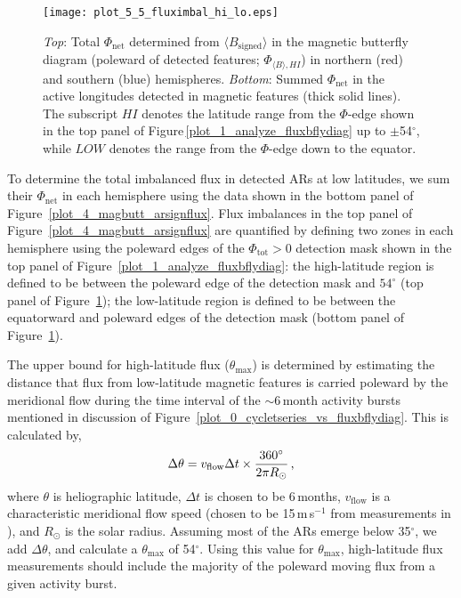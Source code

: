 \begin{figure}[!t]
\centerline{\texttt{[image: plot\_5\_5\_fluximbal\_hi\_lo.eps]}}
\caption[The $\Phi_{\mathrm{net}}$ measured in each hemisphere.]{\emph{Top}: Total $\Phi_{\mathrm{net}}$ determined from $\langle B_{\mathrm{signed}}\rangle$ in the magnetic butterfly diagram (poleward of detected features; $\Phi_{\langle B \rangle,HI}$) in northern (red) and southern (blue) hemispheres. \emph{Bottom}: Summed $\Phi_{\mathrm{net}}$ in the active longitudes detected in magnetic features (thick solid lines). 
The subscript $HI$ denotes the latitude range from the $\Phi$-edge shown in the top panel of Figure\,\ref{plot_1_analyze_fluxbflydiag} up to $\pm$54$^\circ$, while $LOW$ denotes the range from the $\Phi$-edge down to the equator.}
\label{plot_5_fluximbal_hi_lo}
\end{figure}

To determine the total imbalanced flux in detected \glspl{AR} at low latitudes, we sum their $\Phi_{\mathrm{net}}$ in each hemisphere using the data shown in the bottom panel of Figure~\ref{plot_4_magbutt_arsignflux}. 
Flux imbalances in the top panel of Figure~\ref{plot_4_magbutt_arsignflux} are quantified by defining two zones in each hemisphere using the poleward edges of the $\Phi_{\mathrm{tot}}$$>$$0$ detection mask shown in the top panel of Figure~\ref{plot_1_analyze_fluxbflydiag}: the high-latitude region is defined to be between the poleward edge of the detection mask and $54^{\circ}$ (top panel of Figure~\ref{plot_5_fluximbal_hi_lo}); the low-latitude region is defined to be between the equatorward and poleward edges of the detection mask (bottom panel of Figure~\ref{plot_5_fluximbal_hi_lo}). 

The upper bound for high-latitude flux ($\theta_{\mathrm{max}}$) is determined by estimating the distance that flux from low-latitude magnetic features is carried poleward by the meridional flow during the time interval of the $\sim$6\,month activity bursts mentioned in discussion of Figure~\ref{plot_0_cycletseries_vs_fluxbflydiag}. This is calculated by,
\begin{equation}
\Delta \theta = v_{\mathrm{flow}}\Delta t \times \frac{360^{\circ}}{2\pi R_{\odot}} \mbox{\,,}
\end{equation}
where $\theta$ is heliographic latitude, $\Delta t$ is chosen to be 6\,months, $v_{\mathrm{flow}}$ is a characteristic meridional flow speed (chosen to be 15\,m\,s$^{-1}$ from measurements in \citet{Hathaway:2010}), and $R_{\odot}$ is the solar radius. Assuming most of the \glspl{AR} emerge below 35$^{\circ}$, we add $\Delta \theta$, and calculate a $\theta_{\mathrm{max}}$ of 54$^\circ$. 
Using this value for $\theta_{\mathrm{max}}$, high-latitude flux measurements should include the majority of the poleward moving flux from a given activity burst.

